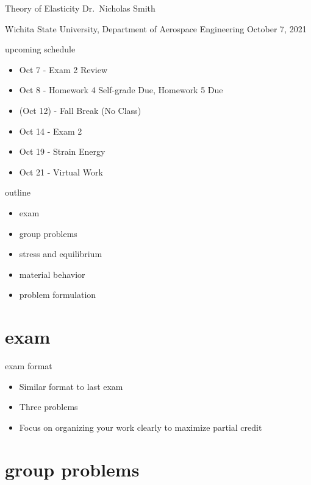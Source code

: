 \documentclass[
  letterpaper,
  ignorenonframetext,
  aspectratio=43,
  handout,
  12pt]{beamer}
\author{}
\date{}
\providecommand{\tightlist}{%
  \setlength{\itemsep}{0pt}\setlength{\parskip}{0pt}}
\providecommand{\tightlist}{%
\setlength{\itemsep}{0pt}\setlength{\parskip}{0pt}}
\begin{document}
\begin{frame}{Theory of Elasticity}
\protect\hypertarget{theory-of-elasticity}{}
Dr.~Nicholas Smith

Wichita State University, Department of Aerospace Engineering October 7,
2021
\end{frame}

\begin{frame}{upcoming schedule}
\protect\hypertarget{upcoming-schedule}{}
\begin{itemize}
\tightlist
\item
  Oct 7 - Exam 2 Review
\item
  Oct 8 - Homework 4 Self-grade Due, Homework 5 Due
\item
  (Oct 12) - Fall Break (No Class)
\item
  Oct 14 - Exam 2
\item
  Oct 19 - Strain Energy
\item
  Oct 21 - Virtual Work
\end{itemize}
\end{frame}

\begin{frame}{outline}
\protect\hypertarget{outline}{}
\begin{itemize}
\tightlist
\item
  exam
\item
  group problems
\item
  stress and equilibrium
\item
  material behavior
\item
  problem formulation
\end{itemize}
\end{frame}

\hypertarget{exam}{%
\section{exam}\label{exam}}

\begin{frame}{exam format}
\protect\hypertarget{exam-format}{}
\begin{itemize}
\tightlist
\item
  Similar format to last exam
\item
  Three problems
\item
  Focus on organizing your work clearly to maximize partial credit
\end{itemize}
\end{frame}

\hypertarget{group-problems}{%
\section{group problems}\label{group-problems}}
\end{document}
